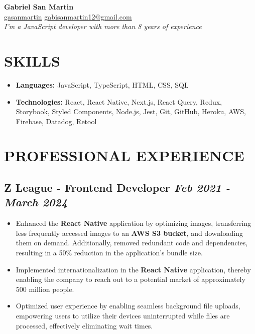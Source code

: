 \documentclass[10pt, a4paper]{article}
\begin{document}
\begin{center}
    \textbf{\huge Gabriel San Martin}
    \\
    \small
    \faLinkedin \hspace{.5pt} \href{https://www.linkedin.com/in/gasanmartin}{gasanmartin}
    \vline \hspace{.5pt}
    \faEnvelope \hspace{.5pt} \href{mailto:gabisanmartin12@gmail.com}{gabisanmartin12@gmail.com}
    \\
    \textit{I'm a JavaScript developer with more than 8 years of experience}
\end{center}

\section{SKILLS}

\begin{itemize}
    \setlength\itemsep{0em}
    \item \textbf{Languages:} JavaScript, TypeScript, HTML, CSS, SQL
    \item \textbf{Technologies:} React, React Native, Next.js, React Query, Redux, Storybook, Styled Components, Node.js, Jest, Git, GitHub, Heroku, AWS, Firebase, Datadog, Retool
\end{itemize}

\section{PROFESSIONAL EXPERIENCE}

\subsection*{Z League - Frontend Developer \hfill \small \textit{Feb 2021 - March 2024}}

\begin{itemize}
    \setlength\itemsep{0em}
    \item Enhanced the \textbf{React Native} application by optimizing images, transferring less frequently accessed images to an \textbf{AWS S3 bucket}, and downloading them on demand. Additionally, removed redundant code and dependencies, resulting in a 50\% reduction in the application's bundle size.
    \item Implemented internationalization in the \textbf{React Native} application, thereby enabling the company to reach out to a potential market of approximately 500 million people.
    \item Optimized user experience by enabling seamless background file uploads, empowering users to utilize their devices uninterrupted while files are processed, effectively eliminating wait times.
\end{itemize}
\end{document}
